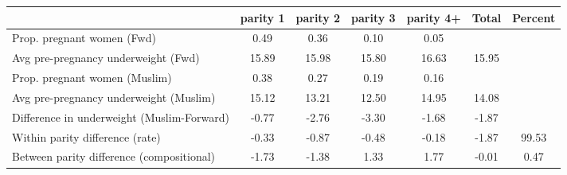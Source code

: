\begin{tabular}{l*{6}{c}}
\toprule
            &\multicolumn{1}{c}{parity 1}&\multicolumn{1}{c}{parity 2}&\multicolumn{1}{c}{parity 3}&\multicolumn{1}{c}{parity 4+}&\multicolumn{1}{c}{Total}&\multicolumn{1}{c}{Percent}\\
\midrule
\midrule
Prop. pregnant women (Fwd)&        0.49&        0.36&        0.10&        0.05&            &            \\
Avg pre-pregnancy underweight (Fwd)&       15.89&       15.98&       15.80&       16.63&       15.95&            \\
Prop. pregnant women (Muslim)&        0.38&        0.27&        0.19&        0.16&            &            \\
Avg pre-pregnancy underweight (Muslim)&       15.12&       13.21&       12.50&       14.95&       14.08&            \\
Difference in underweight (Muslim-Forward)&       -0.77&       -2.76&       -3.30&       -1.68&       -1.87&            \\
Within parity difference (rate)&       -0.33&       -0.87&       -0.48&       -0.18&       -1.87&       99.53\\
Between parity difference (compositional)&       -1.73&       -1.38&        1.33&        1.77&       -0.01&        0.47\\
\bottomrule
\end{tabular}
